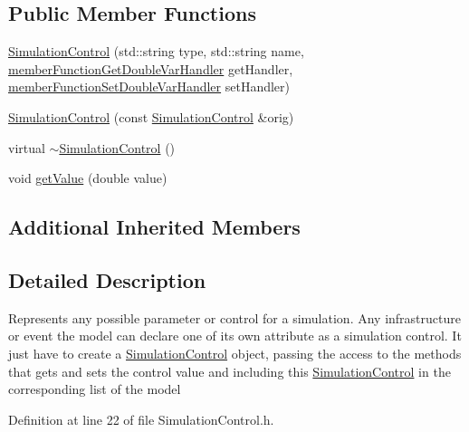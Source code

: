 \subsection*{Public Member Functions}
\begin{DoxyCompactItemize}
\item 
\hyperlink{class_simulation_control_ac267bc01748eed55f8f10ceb6dcd705c}{Simulation\-Control} (std\-::string type, std\-::string name, \hyperlink{_on_event_manager_8h_aa97195a0d80442c68665a1267e6ea97b}{member\-Function\-Get\-Double\-Var\-Handler} get\-Handler, \hyperlink{_on_event_manager_8h_a82a7292bfc6ddeaf96ebc9f3e2389467}{member\-Function\-Set\-Double\-Var\-Handler} set\-Handler)
\item 
\hyperlink{class_simulation_control_a12851e6e9168d46c2a9761ac52b6b49c}{Simulation\-Control} (const \hyperlink{class_simulation_control}{Simulation\-Control} \&orig)
\item 
virtual \hyperlink{class_simulation_control_ae6e46cf7af75d2d6755bcb99ac1a6b23}{$\sim$\-Simulation\-Control} ()
\item 
void \hyperlink{class_simulation_control_ac46ad05e94e936b335f67457819f1ff5}{get\-Value} (double value)
\end{DoxyCompactItemize}
\subsection*{Additional Inherited Members}


\subsection{Detailed Description}
Represents any possible parameter or control for a simulation. Any infrastructure or event the model can declare one of its own attribute as a simulation control. It just have to create a \hyperlink{class_simulation_control}{Simulation\-Control} object, passing the access to the methods that gets and sets the control value and including this \hyperlink{class_simulation_control}{Simulation\-Control} in the corresponding list of the model 

Definition at line 22 of file Simulation\-Control.\-h.



